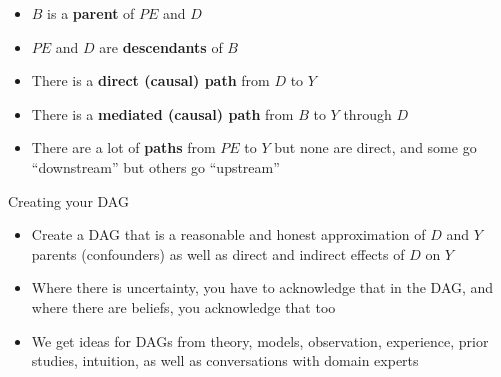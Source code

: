 \documentclass{beamer}
\begin{document}
\begin{frame}[plain]

  \begin{center}
  \end{center}

  \bigskip
  \begin{itemize}
    \item $B$ is a \textbf{parent} of $PE$ and $D$
    \item $PE$ and $D$ are \textbf{descendants} of $B$
    \item There is a \textbf{direct (causal) path} from $D$ to $Y$
    \item There is a \textbf{mediated (causal) path} from $B$ to $Y$ through $D$
    \item There are a lot of \textbf{paths} from $PE$ to $Y$ but none are direct, and some go ``downstream'' but others go ``upstream''
  \end{itemize}
\end{frame}





\begin{frame}{Creating your DAG}

	\begin{itemize}
	\item Create a DAG that is a reasonable and honest approximation of $D$ and $Y$ parents (confounders) as well as direct and indirect effects of $D$ on $Y$
	\item Where there is uncertainty, you have to acknowledge that in the DAG, and where there are beliefs, you acknowledge that too
	\item We get ideas for DAGs from theory, models, observation, experience, prior studies, intuition, as well as conversations with domain experts
	\end{itemize}

\end{frame}
\end{document}
